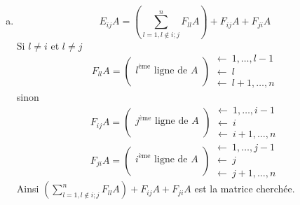 \begin{enumerate}[a)]
  \item $$E_{ij} A = \left( \sum_{l=1, l \notin {i; j}}^n F_{ll} A \right) + F_{ij} A + F_{ji} A$$
    Si $l\neq i$ et $l\neq j$ 
    $$F_{ll} A =
      \begin{pmatrix}
        \\ l^{\text{ème}} \text{ ligne de } A \\ \\
      \end{pmatrix} 
      \begin{array}{l} 
        \leftarrow ~ 1, \ldots, l-1 \\ \leftarrow ~ l \\ \leftarrow ~ l+1, \ldots, n 
      \end{array}$$
    sinon
      $$F_{ij} A =
      \begin{pmatrix}
        \\ j^{\text{ème}} \text{ ligne de } A \\ \\
      \end{pmatrix} 
      \begin{array}{l} 
        \leftarrow ~ 1, \ldots, i-1 \\ \leftarrow ~ i \\ \leftarrow ~ i+1, \ldots, n 
      \end{array}$$
      $$F_{ji} A =
      \begin{pmatrix}
        \\ i^{\text{ème}} \text{ ligne de } A \\ \\
      \end{pmatrix} 
      \begin{array}{l} 
        \leftarrow ~ 1, \ldots, j-1 \\ \leftarrow ~ j \\ \leftarrow ~ j+1, \ldots, n 
      \end{array}$$
    Ainsi $\left( \sum_{l=1, l \notin {i; j}}^{n} F_{ll} A \right) + F_{ij} A + F_{ji} A$ est la matrice cherchée.
\end{enumerate}

